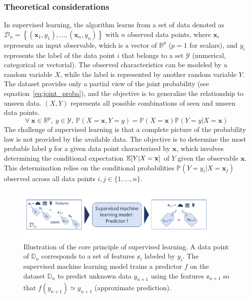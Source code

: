 \documentclass[main]{subfiles}
\begin{document}
\subsubsection{Theoretical considerations}

In supervised learning, the algorithm learns from a set of data denoted as $\mathcal{D}_{n}=\left\{(\mathbf{x}_{1},y_{1}),...,(\mathbf{x}_{n},y_{n})\right\}$ with $n$ observed data points, where $\mathbf{x}_{i}$ represents an input observable, which is a vector of $\mathbb{R}^{p}$ ($p=1$ for scalars), and $y_{i}$ represents the label of the data point $i$ that belongs to a set $\mathcal{Y}$ (numerical, categorical or vectorial). 
The observed characteristics can be modeled by a random variable $X$, while the label is represented by another random variable $Y$. The dataset provides only a partial view of the joint probability (see equation~\ref{eq:joint_proba}), and the objective is to generalize the relationship to unseen data. $(X,Y)$ represents all possible combinations of seen and unseen data points.
\begin{equation}\label{eq:joint_proba}
  \forall\ \mathbf{x}\in\mathbb{R}^{p},\ y\in\mathcal{Y},\ \mathbb{P}\left(X=\mathbf{x}, Y=y\right) = \mathbb{P}(X=\mathbf{x})\mathbb{P}(Y=y|X=\mathbf{x})
\end{equation}
The challenge of supervised learning is that a complete picture of the probability law is not provided by the available data. The objective is to determine the most probable label $y$ for a given data point characterized by $\mathbf{x}$, which involves determining the conditional expectation $\mathbb{E}{\left[Y|X=\mathbf{x}\right]}$ of $Y$ given the observable $\mathbf{x}$. This determination relies on the conditional probabilities $\mathbb{P}(Y=y_i|X=\mathbf{x}_j)$ observed across all data points $i,j\in\{1,\ldots,n\}$.

\begin{figure}[ht]
  \centering
    \includegraphics[width=0.9\textwidth]{figures/4-ml/machine learning.pdf}
    \caption{Illustration of the core principle of supervised learning. A data point of $\mathbb{D}_n$ corresponds to a set of features $\mathbb{x}_i$ labeled by $y_i$. The supervised machine learning model trains a predictor $f$ on the dataset $\mathbb{D}_n$ to predict unknown data $y_{n+1}$ using the features $\mathbb{x}_{n+1}$ so that $f(y_{n+1})\simeq y_{n+1}$ (approximate prediction).}\label{fgr:supervised_leaning}
\end{figure}
\end{document}
